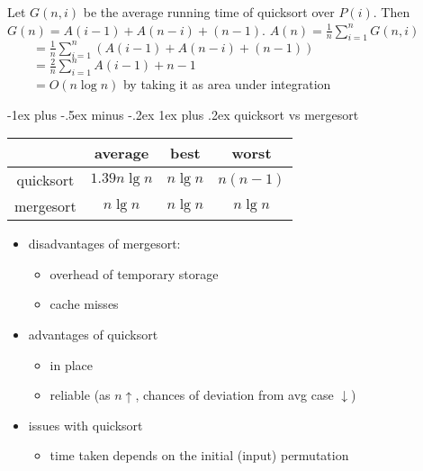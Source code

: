 \documentclass[10pt, landscape]{article}
\makeatletter
\renewcommand{\subsubsection}{\@startsection{subsubsection}{3}{0mm}%
  {-1ex plus -.5ex minus -.2ex}%
  {1ex plus .2ex}%
{\normalfont\small\bfseries}}%
\makeatother
\begin{document}
\begin{multicols*}{4}
\begin{niceproof}
    Let $G(n, i)$ be the average running time of quicksort over $P(i)$.
    Then $G(n) = A(i-1) + A(n-i) + (n-1)$.
    $A(n) = \frac{1}{n} \sum_{i=1}^n G(n, i)$
    \\ $\quad\quad = \frac{1}{n} \sum_{i=1}^n ( A(i-1) + A(n-i) + (n-1) )$
    \\ $\quad\quad = \frac{2}{n} \sum_{i=1}^n A(i-1)+n-1$
    \\ $\quad\quad = O(n\log n)$ by taking it as area under integration
  \end{niceproof}

  \subsubsection{quicksort vs mergesort}

  \begin{center}
    \begin{tabular}{|c|c|c|c|}
      \hline
      & average & best & worst \\\hline
      quicksort & $1.39n\lg n$ &  $n \lg n$ & $n(n-1)$ \\\hline
      mergesort & $n\lg n$ &  $n \lg n$ & $n \lg n$ \\\hline
    \end{tabular}
  \end{center}

  \begin{itemize}
    \item disadvantages of mergesort:
      \begin{itemize}
        \item overhead of temporary storage
        \item cache misses
      \end{itemize}
    \item advantages of quicksort
      \begin{itemize}
        \item in place
        \item reliable (as $n \uparrow$, chances of deviation from avg case $\downarrow$)
      \end{itemize}
    \item issues with quicksort
      \begin{itemize}
        \item {} time taken depends on the initial (input) permutation
      \end{itemize}
  \end{itemize}


\end{multicols*}
\end{document}
